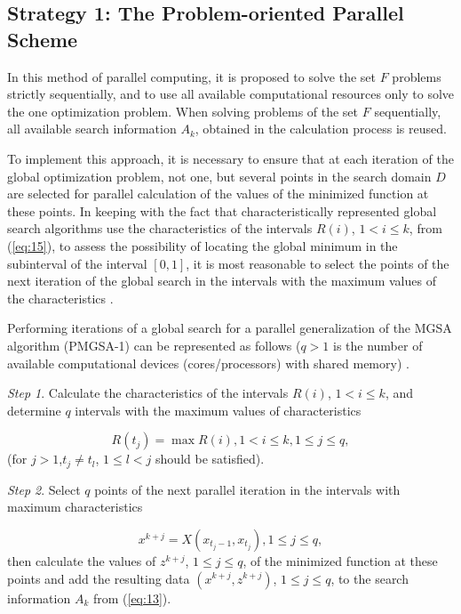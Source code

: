 \documentclass[review]{elsarticle}
\begin{document}
\subsection{Strategy 1: The Problem-oriented Parallel Scheme} \label{subsec:1}

In this method of parallel computing, it is proposed to solve the set $F$ problems strictly sequentially, and to use all available computational resources only to solve the one optimization problem. When solving problems of the set $F$ sequentially, all available search information $A_k$, obtained in the calculation process is reused. 

To implement this approach, it is necessary to ensure that at each iteration of the global optimization problem, not one, but several points in the search domain $D$ are selected for parallel calculation of the values of the minimized function at these points. In keeping with the fact that characteristically represented global search algorithms use the characteristics of the intervals $R(i)$, $1 < i \leq k$, from (\ref{eq:15}), to assess the possibility of locating the global minimum in the subinterval of the interval $[0,1]$, it is most reasonable to select the points of the next iteration of the global search in the intervals with the maximum values of the characteristics \cite{c33,c34,c35}.

Performing iterations of a global search for a parallel generalization of the MGSA algorithm (PMGSA-1) can be represented as follows ($q>1$ is the number of available computational devices (cores/processors) with shared memory) \cite{c33,c34,c32}.

\textit{Step 1}. Calculate the characteristics of the intervals $R(i)$, $1 < i \leq k$, and determine $q$ intervals with the maximum values of characteristics 

\begin{equation}\label{eq:25}
R(t_j)=\max{R(i)},1 < i \leq k, 1 \leq j\leq q,
\end{equation}
(for $j>1$,$t_j \neq t_l$, $1 \leq l < j$ should be satisfied).

\textit{Step 2}. Select $q$ points of the next parallel iteration in the intervals with maximum characteristics

\begin{equation}\label{eq:26}
x^{k+j}=X(x_{t_j-1},x_{t_j} ), 1 \leq j \leq q,
\end{equation}
then calculate the values of $z^{k+j}$, $1 \leq j \leq q$, of the minimized function at these points and add the resulting data $(x^{k+j},z^{k+j})$, $1 \leq j \leq q$, to the search information $A_k$ from (\ref{eq:13}).
\end{document}
